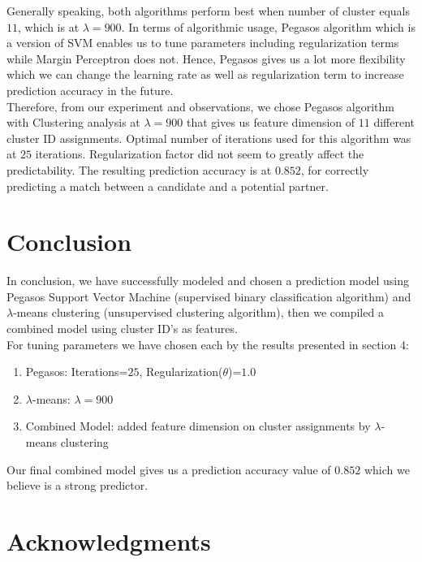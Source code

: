 \documentclass[11pt,letterpaper]{article}
\begin{document}
\begin{enumerate}
Generally speaking, both algorithms perform best when number of cluster equals $11$, which is at $\lambda=900$. In terms of algorithmic usage, Pegasos algorithm which is a version of SVM enables us to tune parameters including regularization terms while Margin Perceptron does not. Hence, Pegasos gives us a lot more flexibility which we can change the learning rate as well as regularization term to increase prediction accuracy in the future.\\

Therefore, from our experiment and observations, we chose Pegasos algorithm with Clustering analysis at $\lambda = 900$ that gives us feature dimension of $11$ different cluster ID assignments. Optimal number of iterations used for this algorithm was at $25$ iterations. Regularization factor did not seem to greatly affect the predictability. The resulting prediction accuracy is at $0.852$, for correctly predicting a match between a candidate and a potential partner.

\end{enumerate}

\section{Conclusion}

In conclusion, we have successfully modeled and chosen a prediction model using Pegasos Support Vector Machine (supervised binary classification algorithm) and $\lambda$-means clustering (unsupervised clustering algorithm), then we compiled a combined model using cluster ID's as features.\\

For tuning parameters we have chosen each by the results presented in section 4:

\begin{enumerate}
\item Pegasos: Iterations=$25$, Regularization($\theta$)=$1.0$
\item $\lambda$-means: $\lambda=900$
\item Combined Model: added feature dimension on cluster assignments by $\lambda$-means clustering
\end{enumerate}

Our final combined model gives us a prediction accuracy value of $0.852$ which we believe is a strong predictor.

\section*{Acknowledgments}
\end{document}
